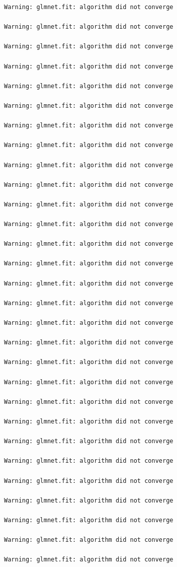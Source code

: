 \documentclass[
  article]{jss}
\begin{document}
\begin{verbatim}
Warning: glmnet.fit: algorithm did not converge

Warning: glmnet.fit: algorithm did not converge

Warning: glmnet.fit: algorithm did not converge

Warning: glmnet.fit: algorithm did not converge

Warning: glmnet.fit: algorithm did not converge

Warning: glmnet.fit: algorithm did not converge

Warning: glmnet.fit: algorithm did not converge

Warning: glmnet.fit: algorithm did not converge

Warning: glmnet.fit: algorithm did not converge

Warning: glmnet.fit: algorithm did not converge

Warning: glmnet.fit: algorithm did not converge

Warning: glmnet.fit: algorithm did not converge

Warning: glmnet.fit: algorithm did not converge

Warning: glmnet.fit: algorithm did not converge

Warning: glmnet.fit: algorithm did not converge

Warning: glmnet.fit: algorithm did not converge

Warning: glmnet.fit: algorithm did not converge

Warning: glmnet.fit: algorithm did not converge

Warning: glmnet.fit: algorithm did not converge

Warning: glmnet.fit: algorithm did not converge

Warning: glmnet.fit: algorithm did not converge

Warning: glmnet.fit: algorithm did not converge

Warning: glmnet.fit: algorithm did not converge

Warning: glmnet.fit: algorithm did not converge

Warning: glmnet.fit: algorithm did not converge

Warning: glmnet.fit: algorithm did not converge

Warning: glmnet.fit: algorithm did not converge

Warning: glmnet.fit: algorithm did not converge

Warning: glmnet.fit: algorithm did not converge


\end{verbatim}
\end{document}
